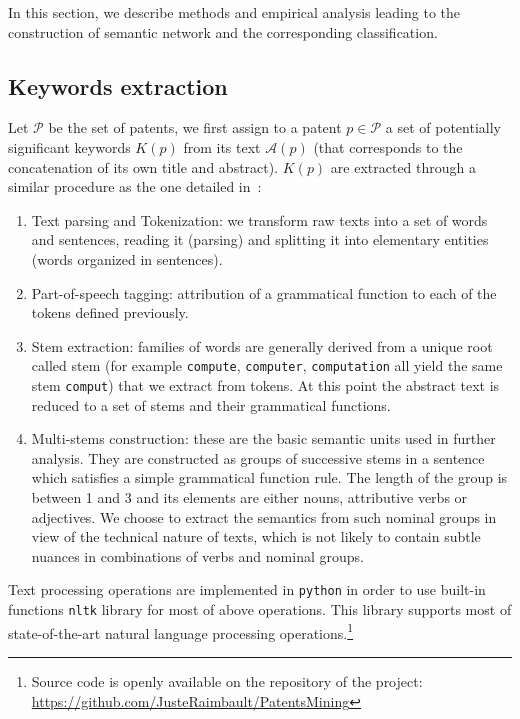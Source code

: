 \documentclass[article]{article}%
\begin{document}
In this section, we describe methods and empirical analysis leading to the construction of semantic network and the corresponding classification. 

\subsection{Keywords extraction}
\label{keywordsextraction}

Let $\mathcal{P}$ be the set of patents, we first assign to a patent $p\in \mathcal{P}$ a set of potentially significant keywords $K(p)$ from its text ${\mathcal{A}}(p)$ (that corresponds to the concatenation of its own title and abstract).
$K(p)$ are extracted through a similar procedure as the one detailed in~\citet{chavalarias2013phylomemetic}: 
\begin{enumerate}
\item Text parsing and Tokenization: we transform raw texts into a set of words and sentences, reading it (parsing) and splitting it into elementary entities (words organized in sentences).

\item Part-of-speech tagging: attribution of a grammatical function to each of the tokens defined previously.

\item Stem extraction: families of words are generally derived from a unique root called stem (for example \texttt{compute}, \texttt{computer}, \texttt{computation} all yield the same stem \texttt{comput}) that we extract from tokens. At this point the abstract text is reduced to a set of stems and their grammatical functions.
\item Multi-stems construction: these are the basic semantic units used in further analysis. They are constructed as groups of successive stems in a sentence which satisfies a simple grammatical function rule. The length of the group is between 1 and 3 and its elements are either nouns, attributive verbs or adjectives. We choose to extract the semantics from such nominal groups in view of the technical nature of texts, which is not likely to contain subtle nuances in combinations of verbs and nominal groups.
\end{enumerate}

Text processing operations are implemented in \texttt{python} in order to use built-in functions \texttt{nltk} library for most of above operations. This library supports most of state-of-the-art natural language processing operations.\footnote{Source code is openly available on the repository of the project: \url{https://github.com/JusteRaimbault/PatentsMining} 
}
\end{document}
